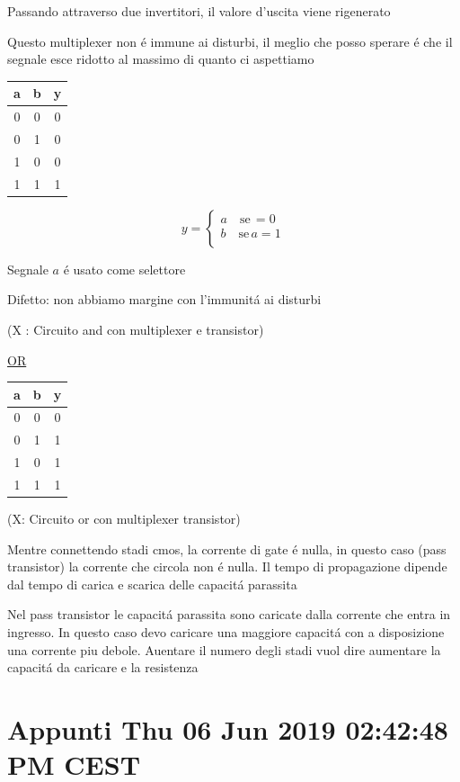 \documentclass{article}
\begin{document}
Passando attraverso due invertitori, il valore d'uscita viene rigenerato

Questo multiplexer non \'e immune ai disturbi, il meglio che posso sperare \'e che il segnale esce ridotto al massimo di quanto ci aspettiamo

\begin{tabular}{c c|c}
    a & b & y\\
    \hline
    0 & 0 & 0\\
    0 & 1 & 0\\
    1 & 0 & 0\\
    1 & 1 & 1\\
\end{tabular}

\[ y = \begin{cases}
    a \quad \text{se} \, =0\\
        b \quad \text{se} \,a = 1\\
    \end{cases}
\]

Segnale $a$ \'e usato come selettore

Difetto: non abbiamo margine con l'immunit\'a ai disturbi

(X : Circuito and con multiplexer e transistor)

\underline{OR}

\begin{tabular}{c c|c}
    a & b & y\\
    \hline
    0 & 0 & 0\\
    0 & 1 & 1\\
    1 & 0 & 1\\
    1 & 1 & 1\\
\end{tabular}

(X: Circuito or con multiplexer transistor)

Mentre connettendo stadi cmos, la corrente di gate \'e nulla, in questo caso (pass transistor) la corrente che circola non \'e nulla. Il tempo di propagazione dipende dal tempo di carica e scarica delle capacit\'a parassita

Nel pass transistor le capacit\'a parassita sono caricate dalla corrente che entra in ingresso. In questo caso devo caricare una maggiore capacit\'a con a disposizione una corrente piu debole. Auentare il numero degli stadi vuol dire aumentare la capacit\'a da caricare e la resistenza



\newpage
\section{Appunti Thu 06 Jun 2019 02:42:48 PM CEST}
\end{document}
